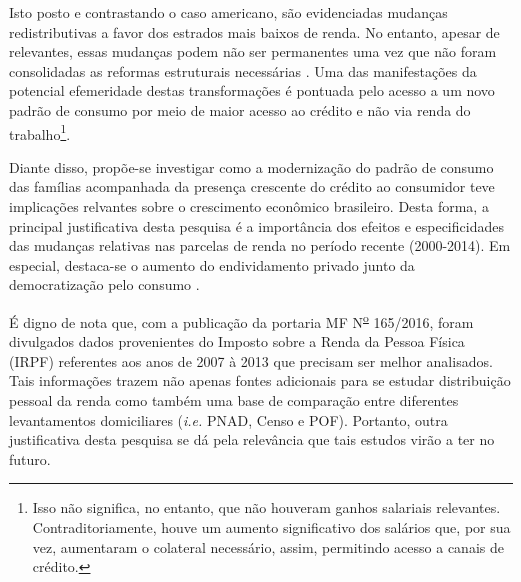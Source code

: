 Isto posto e contrastando o caso americano, são evidenciadas mudanças redistributivas a favor dos estrados mais baixos de renda. No entanto, apesar de relevantes, essas mudanças podem não ser permanentes uma vez que não foram consolidadas as reformas estruturais necessárias \cite{carneiro_politica_2018}. Uma das manifestações da potencial efemeridade destas transformações é pontuada pelo acesso a um novo padrão de consumo por meio de maior acesso ao crédito e não via renda do trabalho\footnote{Isso não significa, no entanto, que não houveram ganhos salariais relevantes. Contraditoriamente, houve um aumento significativo dos salários que, por sua vez, aumentaram o colateral necessário, assim, permitindo acesso a canais de crédito.}.  



Diante disso, propõe-se investigar como a modernização do padrão de consumo das famílias acompanhada da presença crescente do crédito ao consumidor teve implicações relvantes sobre o crescimento econômico brasileiro.
Desta forma, a principal justificativa desta pesquisa é a importância dos efeitos e especificidades das mudanças relativas nas parcelas de renda no período recente (2000-2014). Em especial, destaca-se o aumento do endividamento privado junto  da democratização pelo consumo \cite{fontenelle_alcances_2016}. 

É digno de nota que, com a publicação da portaria MF N\textsuperscript{\underline{o}} 165/2016,
foram divulgados dados provenientes do Imposto sobre a Renda da Pessoa Física (IRPF) referentes aos anos de 2007 à 2013 que precisam ser melhor analisados. Tais informações trazem não apenas fontes adicionais para se estudar distribuição pessoal da renda como também uma base de comparação entre diferentes levantamentos domiciliares (\textit{i.e.} PNAD, Censo e POF).  
Portanto, outra justificativa desta pesquisa se dá pela relevância que tais estudos virão a ter no futuro.




